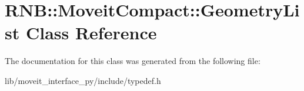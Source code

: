 \hypertarget{class_r_n_b_1_1_moveit_compact_1_1_geometry_list}{}\section{R\+NB\+:\+:Moveit\+Compact\+:\+:Geometry\+List Class Reference}
\label{class_r_n_b_1_1_moveit_compact_1_1_geometry_list}


The documentation for this class was generated from the following file\+:\begin{DoxyCompactItemize}
\item 
lib/moveit\+\_\+interface\+\_\+py/include/typedef.\+h\end{DoxyCompactItemize}
